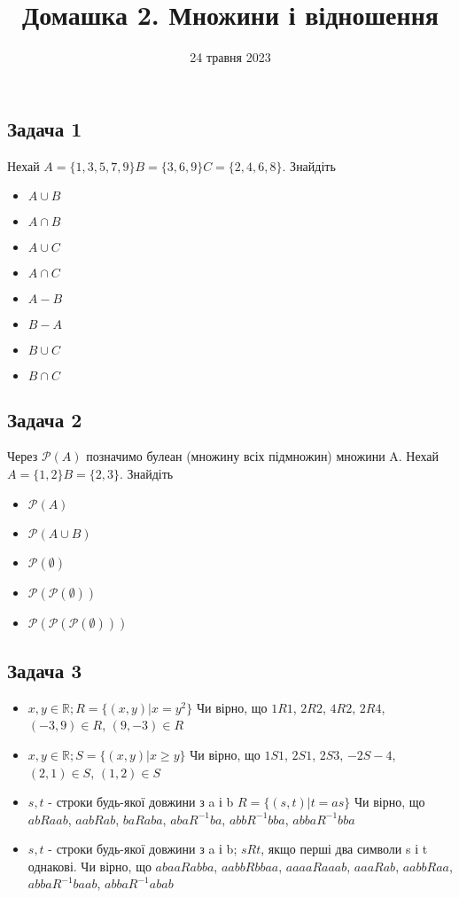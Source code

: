 \documentclass{article}
\begin{document}
\title{Домашка 2. Множини і відношення}
\date{24 травня 2023}

\maketitle

\subsection*{Задача 1}
Нехай $A=\{1,3,5,7,9\} B=\{3,6,9\} C=\{2,4,6,8\}$. Знайдіть
\begin{itemize}
    \item $A \cup B$
    \item $A \cap B$
    \item $A \cup C$
    \item $A \cap C$
    \item $A - B$
    \item $B - A$
    \item $B \cup C$
    \item $B \cap C$
\end{itemize}

\subsection*{Задача 2}
Через $\mathcal{P}(A)$ позначимо булеан (множину всіх підмножин) множини A. Нехай $A=\{1, 2\} B=\{2,3\}$. Знайдіть
\begin{itemize}
    \item $\mathcal{P}(A)$
    \item $\mathcal{P}(A \cup B)$
    \item $\mathcal{P}(\emptyset)$
    \item $\mathcal{P}(\mathcal{P}(\emptyset))$
    \item $\mathcal{P}(\mathcal{P}(\mathcal{P}(\emptyset)))$
\end{itemize}

\subsection*{Задача 3}
\begin{itemize}
    \item $x,y \in \mathbb{R}; R = \{(x,y)|x=y^2\}$ Чи вірно, що $1R1$, $2R2$, $4R2$, $2R4$, $(-3,9)\in R$, $(9,-3)\in R$
    \item $x,y \in \mathbb{R}; S = \{(x,y)|x \geq y\}$ Чи вірно, що $1S1$, $2S1$, $2S3$, $-2S-4$, $(2,1)\in S$, $(1,2)\in S$
    \item $s,t$ - строки будь-якої довжини з a і b $R = \{(s,t)|t=as\}$
Чи вірно, що $abRaab$, $aabRab$, $baRaba$, $abaR^{-1}ba$, $abbR^{-1}bba$, $abbaR^{-1}bba$
    \item $s,t$ - строки будь-якої довжини з a і b; $sRt$, якщо перші два символи s і t однакові.
Чи вірно, що $abaaRabba$, $aabbRbbaa$, $aaaaRaaab$, $aaaRab$, $aabbRaa$, $abbaR^{-1}baab$, $abbaR^{-1}abab$
\end{itemize}
\end{document}
